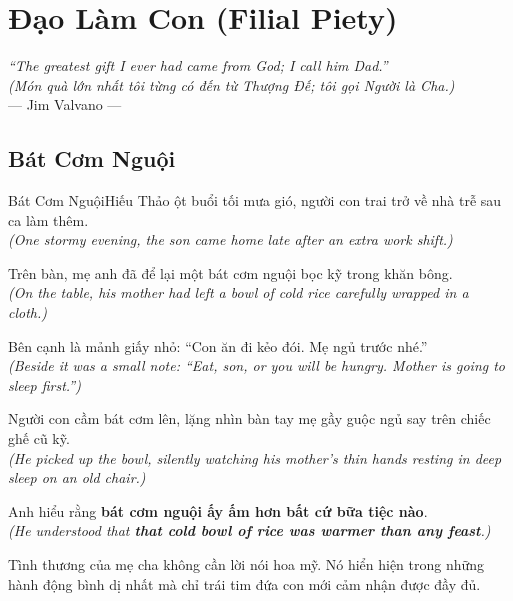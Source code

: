 \chapter{Đạo Làm Con (Filial Piety)}

\begin{center}
  \textit{\color{truyenblue}``The greatest gift I ever had came from God; I call him Dad.''}\\
  \textit{(Món quà lớn nhất tôi từng có đến từ Thượng Đế; tôi gọi Người là Cha.)}\\[4pt]
  \small\color{truyengold}--- Jim Valvano ---
\end{center}
\ngancach

\section{Bát Cơm Nguội}
\begin{truyen}{Bát Cơm Nguội}{Hiếu Thảo}
ột buổi tối mưa gió, người con trai trở về nhà trễ sau ca làm thêm.\\
\textit{(One stormy evening, the son came home late after an extra work shift.)}

Trên bàn, mẹ anh đã để lại một bát cơm nguội bọc kỹ trong khăn bông.\\
\textit{(On the table, his mother had left a bowl of cold rice carefully wrapped in a cloth.)}

Bên cạnh là mảnh giấy nhỏ: ``Con ăn đi kẻo đói. Mẹ ngủ trước nhé.''\\
\textit{(Beside it was a small note: ``Eat, son, or you will be hungry. Mother is going to sleep first.'')}

Người con cầm bát cơm lên, lặng nhìn bàn tay mẹ gầy guộc ngủ say trên chiếc ghế cũ kỹ.\\
\textit{(He picked up the bowl, silently watching his mother's thin hands resting in deep sleep on an old chair.)}

Anh hiểu rằng \textbf{bát cơm nguội ấy ấm hơn bất cứ bữa tiệc nào}.\\
\textit{(He understood that \textbf{that cold bowl of rice was warmer than any feast}.)}
\end{truyen}
\begin{baihoc}
  Tình thương của mẹ cha không cần lời nói hoa mỹ. Nó hiển hiện trong những hành động bình dị nhất mà chỉ trái tim đứa con mới cảm nhận được đầy đủ.
\end{baihoc}

